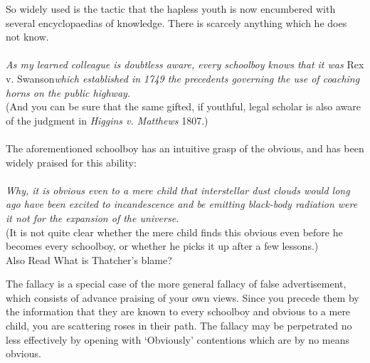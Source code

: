 \documentclass[a4paper,12pt,single,pdftex]{scrartcl}
\begin{document}
    
      So widely used is the tactic that the hapless youth is now encumbered with several encyclopaedias of knowledge. There is scarcely anything which he does not know.
    \\

    
       
    \\

    
      {\em As my learned colleague is doubtless aware, every schoolboy knows that it was }Rex v. Swanson{\em  which established in 1749 the precedents governing the use of coaching horns on the public highway.}
    \\

    
      (And you can be sure that the same gifted, if youthful, legal scholar is also aware of the judgment in {\em Higgins v. Matthews} 1807.)
    \\

    
       
    \\

    
      The aforementioned schoolboy has an intuitive grasp of the obvious, and has been widely praised for this ability:
    \\

    
       
    \\

    
      {\em Why, it is obvious even to a mere child that interstellar dust clouds would long ago have been excited to incandescence and be emitting black-body radiation were it not for the expansion of the universe.}
    \\

    
      (It is not quite clear whether the mere child finds this obvious even before he becomes every schoolboy, or whether he picks it up after a few lessons.)
    \\

    
      

      
        Also Read  What is Thatcher's blame?
      
    
    
      The fallacy is a special case of the more general fallacy of false advertisement, which consists of advance praising of your own views. Since you precede them by the information that they are known to every schoolboy and obvious to a mere child, you are scattering roses in their path. The fallacy may be perpetrated no less effectively by opening with ‘Obviously’ contentions which are by no means obvious.
    \\
\end{document}
